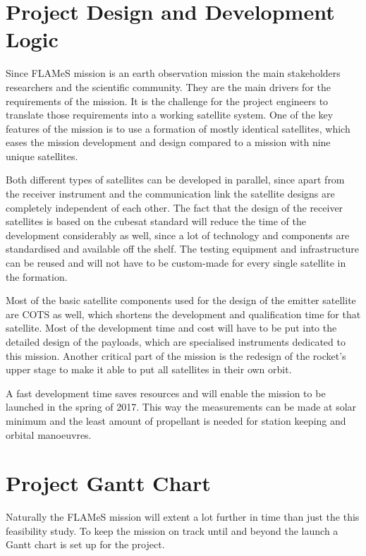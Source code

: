 \section{Project Design and Development Logic}
\label{frPMgantt}
Since \ac{FLAMeS} mission is an earth observation mission the main stakeholders researchers and the scientific community. They are the main drivers for the requirements of the mission. It is the challenge for the project engineers to translate those requirements into a working satellite system. One of the key features of the mission is to use a formation of mostly identical satellites, which eases the mission development and design compared to a mission with nine unique satellites. 

Both different types of satellites can be developed in parallel, since apart from the receiver instrument and the communication link the satellite designs are completely independent of each other. The fact that the design of the receiver satellites is based on the cubesat standard will reduce the time of the development considerably as well, since a lot of technology and components are standardised and available off the shelf. The testing equipment and infrastructure can be reused and will not have to be custom-made for every single satellite in the formation. 

Most of the basic satellite components used for the design of the emitter satellite are \ac{COTS} as well, which shortens the development and qualification time for that satellite. Most of the development time and cost will have to be put into the detailed design of the payloads, which are specialised instruments dedicated to this mission. Another critical part of the mission is the redesign of the rocket's upper stage to make it able to put all satellites in their own orbit.

A fast development time saves resources and will enable the mission to be launched in the spring of 2017. This way the measurements can be made at solar minimum and the least amount of propellant is needed for station keeping and orbital manoeuvres.

\section{Project Gantt Chart}
Naturally the \ac{FLAMeS} mission will extent a lot further in time than just the this feasibility study. To keep the mission on track until and beyond the launch a Gantt chart is set up for the project.

